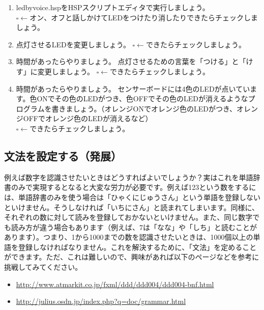 \documentclass[a4paper,dvipdfmx]{jarticle}
\newcommand\liststyleLxv{%
\renewcommand\theenumi{\arabic{enumi}}
\renewcommand\theenumii{\arabic{enumii}}
\renewcommand\theenumiii{\arabic{enumiii}}
\renewcommand\theenumiv{\arabic{enumiv}}
\renewcommand\labelenumi{\theenumi.}
\renewcommand\labelenumii{\theenumii.}
\renewcommand\labelenumiii{\theenumiii.}
\renewcommand\labelenumiv{\theenumiv.}
}
\newcommand\liststyleLxvi{%
\renewcommand\labelitemi{{\textbullet}}
\renewcommand\labelitemii{${\circ}$}
\renewcommand\labelitemiii{${\blacksquare}$}
\renewcommand\labelitemiv{{\textbullet}}
}
\begin{document}
\liststyleLxv
\begin{enumerate}
\item
ledbyvoice.hspをHSPスクリプトエディタで実行しましょう。\newline
${\square}\leftarrow
オン、オフと話しかけて$LEDをつけたり消したりできたらチェックしましょう。
\item 点灯させるLEDを変更しましょう。\newline
${\square}\leftarrow できたらチェックしましょう。$
\item 時間があったらやりましょう。\newline
点灯させるための言葉を「つける」と「けす」に変更しましょう。\newline
${\square}\leftarrow できたらチェックしましょう。$
\item 時間があったらやりましょう。\newline
センサーボードには4色のLEDが点いています。色ONでその色のLEDがつき、色OFFでその色のLEDが消えるようなプログラムを書きましょう。（オレンジONでオレンジ色のLEDがつき、オレンジOFFでオレンジ色のLEDが消えるなど）\newline
${\square}\leftarrow できたらチェックしましょう。$
\end{enumerate}
\subsection[文法を設定する（発展）]{文法を設定する（発展）}
{
例えば数字を認識させたいときはどうすればよいでしょうか？実はこれを単語辞書のみで実現するとなると大変な労力が必要です。例えば123という数をするには、単語辞書のみを使う場合は「ひゃくにじゅうさん」という単語を登録しないといけません。そうしなければ「いちにさん」と読まれてしまいます。同様に、それぞれの数に対して読みを登録しておかないといけません。また、同じ数字でも読み方が違う場合もあります（例えば、7は「なな」や「しち」と読むことがあります）。つまり、1から1000までの数を認識させたいときは、1000個以上の単語を登録しなければなりません。これを解決するために、「文法」を定めることができます。ただ、これは難しいので、興味があれば以下のページなどを参考に挑戦してみてください。}

\liststyleLxvi
\begin{itemize}
\item {
\url{http://www.atmarkit.co.jp/fxml/ddd/ddd004/ddd004-bnf.html} }
\item {
\href{http://julius.osdn.jp/index.php?q=doc/grammar.html}{http://julius.osdn.jp/index.php?q=doc/grammar.htm}\href{http://julius.osdn.jp/index.php?q=doc/grammar.html}{l}}
\end{itemize}
\end{document}
